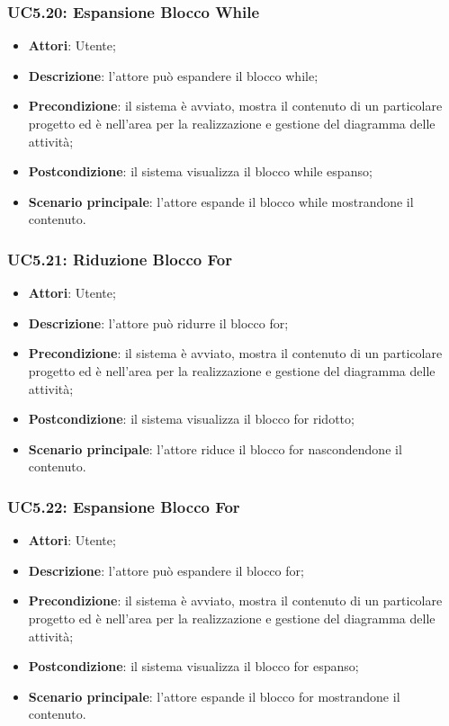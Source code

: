 \subsubsection{UC5.20: Espansione Blocco While}
\label{UC5.20}
\begin{itemize}
	\item \textbf{Attori}: Utente;
	\item \textbf{Descrizione}: l'attore può espandere il blocco while;
	\item \textbf{Precondizione}: il sistema è avviato, mostra il contenuto di un particolare progetto ed è nell'area per la realizzazione e gestione del diagramma delle attività;
	\item \textbf{Postcondizione}: il sistema visualizza il blocco while espanso;
	\item \textbf{Scenario principale}: l'attore espande il blocco while mostrandone il contenuto.
\end{itemize}

\subsubsection{UC5.21: Riduzione Blocco For}
\label{UC5.21}
\begin{itemize}
	\item \textbf{Attori}: Utente;
	\item \textbf{Descrizione}: l'attore può ridurre il blocco for;
	\item \textbf{Precondizione}: il sistema è avviato, mostra il contenuto di un particolare progetto ed è nell'area per la realizzazione e gestione del diagramma delle attività;
	\item \textbf{Postcondizione}: il sistema visualizza il blocco for ridotto;
	\item \textbf{Scenario principale}: l'attore riduce il blocco for nascondendone il contenuto.
\end{itemize}

\subsubsection{UC5.22: Espansione Blocco For}
\label{UC5.22}
\begin{itemize}
	\item \textbf{Attori}: Utente;
	\item \textbf{Descrizione}: l'attore può espandere il blocco for;
	\item \textbf{Precondizione}: il sistema è avviato, mostra il contenuto di un particolare progetto ed è nell'area per la realizzazione e gestione del diagramma delle attività;
	\item \textbf{Postcondizione}: il sistema visualizza il blocco for espanso;
	\item \textbf{Scenario principale}: l'attore espande il blocco for mostrandone il contenuto.
\end{itemize}

